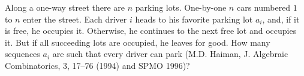 Along a one-way street there are $n$ parking lots. One-by-one $n$ cars numbered $1$ to $n$ enter the street. Each driver $i$ heads to his favorite parking lot $a_i$, and, if it is free, he occupies it. Otherwise, he continues to the next free lot and occupies it. But if all succeeding lots are occupied, he leaves for good. How many sequences $a_i$ are such that every driver can park (M.D. Haiman, J. Algebraic Combinatorics, 3, 17--76 (1994) and SPMO 1996)?

